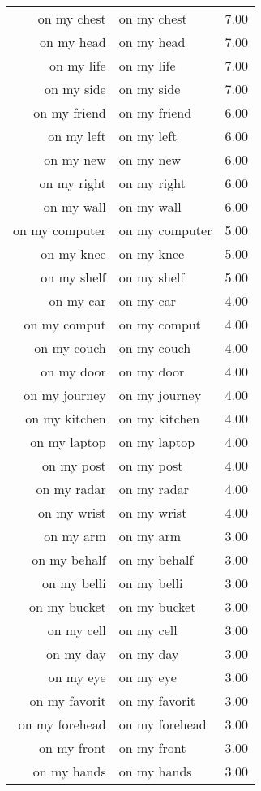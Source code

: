 \begin{table}[ht]
\begin{tabular}{rlr}
  on my chest & on my chest & 7.00 \\ 
  on my head & on my head & 7.00 \\ 
  on my life & on my life & 7.00 \\ 
  on my side & on my side & 7.00 \\ 
  on my friend & on my friend & 6.00 \\ 
  on my left & on my left & 6.00 \\ 
  on my new & on my new & 6.00 \\ 
  on my right & on my right & 6.00 \\ 
  on my wall & on my wall & 6.00 \\ 
  on my computer & on my computer & 5.00 \\ 
  on my knee & on my knee & 5.00 \\ 
  on my shelf & on my shelf & 5.00 \\ 
  on my car & on my car & 4.00 \\ 
  on my comput & on my comput & 4.00 \\ 
  on my couch & on my couch & 4.00 \\ 
  on my door & on my door & 4.00 \\ 
  on my journey & on my journey & 4.00 \\ 
  on my kitchen & on my kitchen & 4.00 \\ 
  on my laptop & on my laptop & 4.00 \\ 
  on my post & on my post & 4.00 \\ 
  on my radar & on my radar & 4.00 \\ 
  on my wrist & on my wrist & 4.00 \\ 
  on my arm & on my arm & 3.00 \\ 
  on my behalf & on my behalf & 3.00 \\ 
  on my belli & on my belli & 3.00 \\ 
  on my bucket & on my bucket & 3.00 \\ 
  on my cell & on my cell & 3.00 \\ 
  on my day & on my day & 3.00 \\ 
  on my eye & on my eye & 3.00 \\ 
  on my favorit & on my favorit & 3.00 \\ 
  on my forehead & on my forehead & 3.00 \\ 
  on my front & on my front & 3.00 \\ 
  on my hands & on my hands & 3.00 \\ 

\end{tabular}
\end{table}
